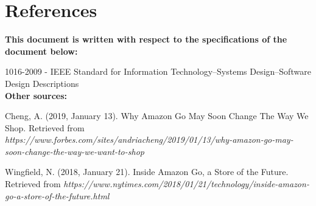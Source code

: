 \documentclass[11pt]{article}
\begin{document}
\section{References}
\textbf{This document is written with respect to the specifications of the document below:\\}

1016-2009 - IEEE Standard for Information Technology--Systems Design--Software Design Descriptions
$$ $$ 
\setlength{\parindent}{1 cm}
\textbf{Other sources:\\}
\begin{hangparas}{1cm}{1}
 \par
 Cheng, A. (2019, January 13). Why Amazon Go May Soon Change The Way We Shop. Retrieved from \textit{https://www.forbes.com/sites/andriacheng/2019/01/13/why-amazon-go-may-soon-change-the-way-we-want-to-shop} 


 \par
 Wingfield, N. (2018, January 21). Inside Amazon Go, a Store of the Future.\\ 
 Retrieved from \textit{https://www.nytimes.com/2018/01/21/technology/inside-amazon-go-a-store-of-the-future.html }
   
\end{hangparas}
\end{document}
